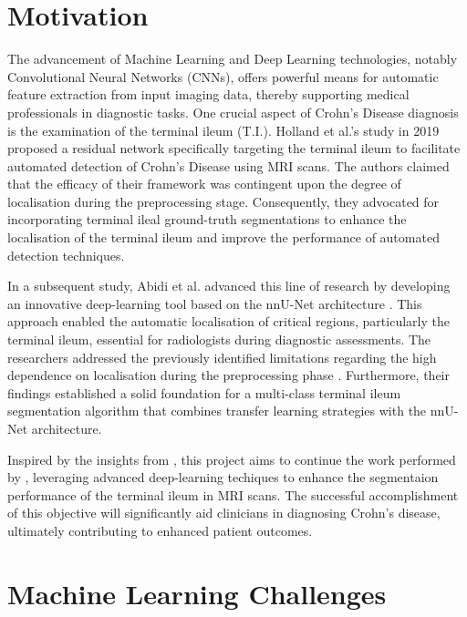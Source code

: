 \section{Motivation}

The advancement of Machine Learning and Deep Learning technologies, notably Convolutional Neural Networks (CNNs), offers powerful means for automatic feature extraction from input imaging data, thereby supporting medical professionals in diagnostic tasks. One crucial aspect of Crohn's Disease diagnosis is the examination of the terminal ileum (T.I.). Holland et al.'s study \cite{holland2019automatic} in 2019 proposed a residual network specifically targeting the terminal ileum to facilitate automated detection of Crohn's Disease using MRI scans. The authors claimed that the efficacy of their framework was contingent upon the degree of localisation during the preprocessing stage. Consequently, they advocated for incorporating terminal ileal ground-truth segmentations to enhance the localisation of the terminal ileum and improve the performance of automated detection techniques.

In a subsequent study, Abidi et al. \cite{Ali2022} advanced this line of research by developing an innovative deep-learning tool based on the nnU-Net architecture \cite{isensee2021nnu}. This approach enabled the automatic localisation of critical regions, particularly the terminal ileum, essential for radiologists during diagnostic assessments. The researchers addressed the previously identified limitations regarding the high dependence on localisation during the preprocessing phase \cite{holland2019automatic}. Furthermore, their findings established a solid foundation for a multi-class terminal ileum segmentation algorithm that combines transfer learning strategies with the nnU-Net architecture.

Inspired by the insights from \cite{holland2019automatic, Ali2022}, this project aims to continue the work performed by \cite{Ali2022}, leveraging advanced deep-learning techiques to enhance the segmentaion performance of the terminal ileum in MRI scans. The successful accomplishment of this objective will significantly aid clinicians in diagnosing Crohn's disease, ultimately contributing to enhanced patient outcomes.

\section{Machine Learning Challenges}

